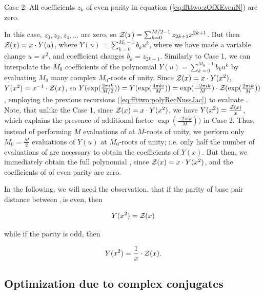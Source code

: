 \medskip
{\sc Case 2}: All coefficients $z_k$ of even parity in
equation (\ref{eq:ffttwo:zOfXEvenN}) are zero.
\smallskip

In this case, $z_0,z_2,z_4,\dots$ are zero, so
${\mathcal Z}_{}(x) = \sum_{k=0}^{M/2-1} z_{2k+1} x^{2k+1}$. But then
${\mathcal Z}_{}(x) = x \cdot Y(u)$, where
$Y(u)= \sum_{k=0}^{M_0-1} b_k u^k$, where we have made
a variable change $u=x^2$, and coefficient changes
$b_k = z_{2k+1}$. Similarly to Case 1,
we can interpolate the $M_0$ coefficients of the polynomial
$Y(u) = \sum_{k=0}^{M_0-1} b_k u^k$
by evaluating $M_0$ many complex $M_0$-roots
of unity.  Since ${\mathcal Z}_{}(x)=x \cdot Y(x^2)$, $Y(x^2) = x^{-1} \cdot {\mathcal Z}_{}(x)$,
so
$Y(\exp(\frac{2\pi i k}{M/2})) = Y(\exp(\frac{4\pi ki}{M})) =
\exp(\frac{-2\pi i k}{M}) \cdot
{\mathcal Z}_{}(\exp(\frac{2\pi i k}{M}))$, employing
the previous recursions (\ref{eq:ffttwo:polyRecNussJac})
to evaluate .  Note, that unlike the
Case 1, since ${\mathcal Z}_{}(x) = x \cdot Y(x^2)$, we have
$Y(x^2)=\frac{{\mathcal Z}_{}(x)}{x}$, which explains the presence of additional factor
$\exp(\frac{-2\pi i k}{M}))$ in Case 2.  Thus, instead of
performing $M$ evaluations of \emZ{} at $M$-roots of unity,
we perform only $M_0=\frac{M}{2}$ evaluations of $Y(u)$ at
$M_0$-roots of unity; i.e. only half the number of
evaluations of \emZ{} are necessary to
obtain the coefficients of $Y(x)$. But then, we immediately obtain the
full polynomial \emZ{}, since ${\mathcal Z}_{}(x) = x \cdot Y(x^2)$, and the
coefficients of \emZ{} of even parity are zero.

In the following, we will need the observation, that if the parity of
base pair distance \dBP{\strA}{\strB} between \strA,\,\strB is
even, then

\begin{align}
\label{eq:ffttwo:evenY}
Y(x^2) = \emZ{}
\end{align}

while if the parity is odd, then

\begin{align}
\label{eq:ffttwo:oddY}
Y(x^2) = \frac{1}{x} \cdot \emZ{}.
\end{align}

\subsection{Optimization due to complex conjugates}
\label{subsec:ffttwo:compconj}

